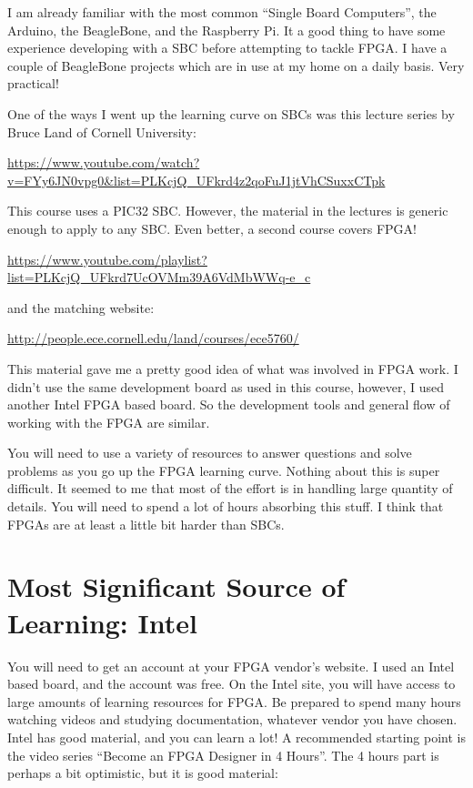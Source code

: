 I am already familiar with the most common ``Single Board Computers'', the Arduino, the BeagleBone, and the Raspberry Pi.
It a good thing to have some experience developing with a SBC before attempting to tackle FPGA.  I have a couple of BeagleBone
projects which are in use at my home on a daily basis.  Very practical!

One of the ways I went up the learning curve on SBCs was this lecture series by Bruce Land of Cornell University:

\url{https://www.youtube.com/watch?v=FYy6JN0vpg0&list=PLKcjQ_UFkrd4z2qoFuJ1jtVhCSuxxCTpk}

This course uses a PIC32 SBC.  However, the material in the lectures is generic enough to apply to any SBC.
Even better, a second course covers FPGA!

\url{https://www.youtube.com/playlist?list=PLKcjQ_UFkrd7UcOVMm39A6VdMbWWq-e_c}

and the matching website:

\url{http://people.ece.cornell.edu/land/courses/ece5760/}

This material gave me a pretty good idea of what was involved in FPGA work.
I didn't use the same development board as used in this course, however, I used
another Intel FPGA based board.  So the development tools and general flow of working
with the FPGA are similar.

You will need to use a variety of resources to answer questions and solve problems as you go up the FPGA learning curve.
Nothing about this is super difficult.  It seemed to me that most of the effort is in handling large quantity of details.
You will need to spend a lot of hours absorbing this stuff.  I think that FPGAs are at least a little bit harder than SBCs.

\section{Most Significant Source of Learning: Intel}

You will need to get an account at your FPGA vendor's website.  I used an Intel based board, and the account was free.
On the Intel site, you will have access to large amounts of learning resources for FPGA.
Be prepared to spend many hours watching videos and studying documentation, whatever vendor you have chosen.
Intel has good material, and you can learn a lot!  A recommended starting point is the video series ``Become an FPGA Designer in 4 Hours''.
The 4 hours part is perhaps a bit optimistic, but it is good material:


